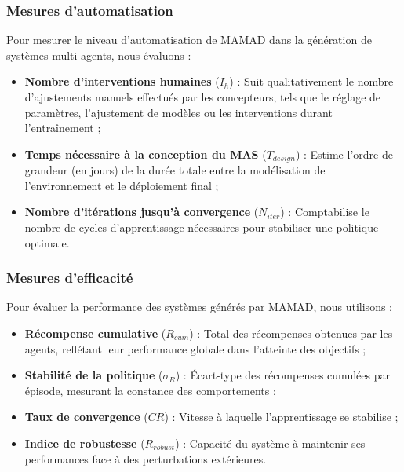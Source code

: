 \documentclass[pdflatex,sn-mathphys-num]{sn-jnl}%
\theoremstyle{thmstyleone}%
\theoremstyle{thmstyletwo}%
\theoremstyle{thmstylethree}%
\begin{document}
\subsubsection{Mesures d'automatisation}
Pour mesurer le niveau d'automatisation de MAMAD dans la génération de systèmes multi-agents, nous évaluons :
\begin{itemize}
    \item \textbf{Nombre d'interventions humaines} ($I_h$) : Suit qualitativement le nombre d'ajustements manuels effectués par les concepteurs, tels que le réglage de paramètres, l'ajustement de modèles ou les interventions durant l'entraînement ;
    \item \textbf{Temps nécessaire à la conception du MAS} ($T_{design}$) : Estime l'ordre de grandeur (en jours) de la durée totale entre la modélisation de l'environnement et le déploiement final ;
    \item \textbf{Nombre d'itérations jusqu'à convergence} ($N_{iter}$) : Comptabilise le nombre de cycles d'apprentissage nécessaires pour stabiliser une politique optimale.
\end{itemize}

\subsubsection{Mesures d'efficacité}
Pour évaluer la performance des systèmes générés par MAMAD, nous utilisons :
\begin{itemize}
    \item \textbf{Récompense cumulative} ($R_{cum}$) : Total des récompenses obtenues par les agents, reflétant leur performance globale dans l'atteinte des objectifs ;
    \item \textbf{Stabilité de la politique} ($\sigma_R$) : Écart-type des récompenses cumulées par épisode, mesurant la constance des comportements ;
    \item \textbf{Taux de convergence} ($CR$) : Vitesse à laquelle l'apprentissage se stabilise ;
    \item \textbf{Indice de robustesse} ($R_{robust}$) : Capacité du système à maintenir ses performances face à des perturbations extérieures.
\end{itemize}
\end{document}
